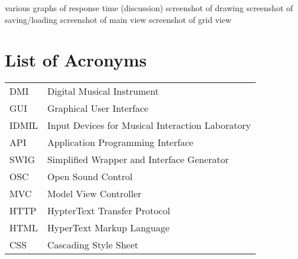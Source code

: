 \documentclass [12pt,letterpaper]{report}
\begin{document}
\tableofcontents
\listoffigures
	various graphs of response time (discussion)
	screenshot of drawing
	screenshot of saving/loading
	screenshot of main view
	screenshot of grid view
\listoftables

\newpage
\chapter*{List of Acronyms}

\begin{longtable}{ll}
    DMI 	& 	Digital Musical Instrument\\
    GUI		& 	Graphical User Interface\\
    IDMIL &   Input Devices for Musical Interaction Laboratory\\ 
    API   &   Application Programming Interface\\
    SWIG  &   Simplified Wrapper and Interface Generator\\
    OSC   &   Open Sound Control\\
    MVC   &   Model View Controller\\
    HTTP  &   HypterText Transfer Protocol\\
    HTML  &   HyperText Markup Language\\
    CSS   &   Cascading Style Sheet\\
\end{longtable}

\cleardoublepage
{}

%
%
\typeout{}

%
\typeout{}

%
\typeout{}

%
\typeout{}

%
\typeout{}

%
\typeout{}




%
%

\typeout{}
    \renewcommand\refname{References}
    
    
\end{document}
